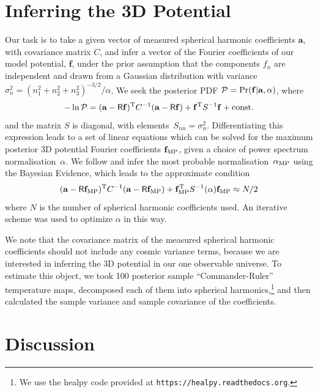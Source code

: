 \documentclass[useAMS,usenatbib,a4paper]{mn2e}
\begin{document}

\section{Inferring the 3D Potential}

Our task is to take a given vector of measured spherical harmonic
coefficients $\mathbf{a}$, with covariance matrix $C$,  and
infer a vector of the Fourier coefficients of our model potential,
$\mathbf{f}$,  under the prior assumption that the  components $f_n$
are independent and drawn from a Gaussian distribution with variance
$\sigma_n^2 = (n_1^2+n_2^2+n_3^2)^{-3/2} / \alpha$. We seek the
posterior PDF ${\cal P} = \Pr(\mathbf{f}|\mathbf{a},\alpha)$, where
\begin{equation}
-\ln{\cal P} = (\mathbf{a}-\ResponseMatrix\mathbf{f})^{\rm T} C^{-1} (\mathbf{a}-\ResponseMatrix\mathbf{f})
             + \mathbf{f}^{\rm T} S^{-1} \mathbf{f} + \text{const.}
\end{equation}
and the matrix $S$ is diagonal, with
elements~$S_{nn} = \sigma_n^2$.
Differentiating this expression leads to a set of linear equations
which can be solved for the maximum posterior 3D potential
Fourier coefficients $\mathbf{f}_{\rm MP}$, given a choice of power spectrum
normalisation~$\alpha$. We follow \citep{SuyuEtal2006} and infer the
most probable normalisation~$\alpha_{\rm MP}$ using the Bayesian Evidence,
which leads to the approximate condition
\begin{equation}
    (\mathbf{a}-\mathsf{R}\mathbf{f}_{\rm MP})^{\rm T} C^{-1} (\mathbf{a}-\mathsf{R}\mathbf{f}_{\rm MP})
                 + \mathbf{f}_{\rm MP}^{\rm T} S^{-1}(\alpha) \mathbf{f}_{\rm MP} \approx N/2
\end{equation}
where $N$ is the number of spherical harmonic coefficients used. An
iterative scheme was used to optimize $\alpha$ in this way.

We note that the covariance matrix of the measured spherical harmonic
coefficients should not include any cosmic variance terms, because we
are interested in inferring the 3D potential in our one observable
universe. To estimate this object, we took 100 posterior sample
``Commander-Ruler'' temperature maps, decomposed each of them into
spherical harmonics,\footnote{We use the {\sc healpy} code provided at
\texttt{https://healpy.readthedocs.org}.} and then calculated the
sample variance and sample covariance of the coefficients.



\section{Discussion}





\end{document}
